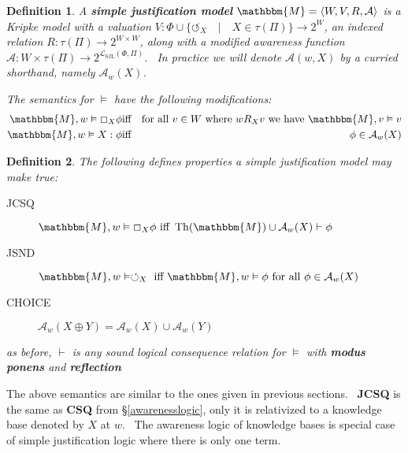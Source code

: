 \documentclass{acmconf}
\newcommand{\tmop}[1]{\ensuremath{\operatorname{#1}}}
\newcommand{\tmstrong}[1]{\textbf{#1}}
\newcommand{\tmtextbf}[1]{{\bfseries{#1}}}
\newenvironment{descriptiondash}{\begin{description} }{\end{description}}
\newtheorem{definition}{Definition}
\begin{document}
\begin{definition}
  \label{justmodels}A {\tmstrong{simple justification model}} $\mathbbm{M}=
  \langle W, V, R, \mathcal{A} \rangle$ is a Kripke model with a valuation $V
  : \Phi \cup \{\circlearrowleft_X \hspace{1em} | \hspace{1em} X \in \tau
  (\Pi)\} \rightarrow 2^W$, an indexed relation $R : \tau (\Pi) \rightarrow
  2^{W \times W}$, along with a modified awareness function $\mathcal{A} : W
  \times \tau (\Pi) \rightarrow 2^{\mathcal{L}_{\tmop{SJL}} (\Phi, \Pi)}$. \
  In practice we will denote $\mathcal{A} (w, X)$ by a curried shorthand,
  namely $\mathcal{A}_w (X)$.
  
  
  
  The semantics for $\vDash$ have the following modifications:
  \begin{eqnarray*}
    \mathbbm{M}, w \vDash \Box_X \phi & \text{iff} & \text{for all $v \in W$
    where $w R_X v$ we have $\mathbbm{M}, v \vDash v$}\\
    \mathbbm{M}, w \vDash X : \phi & \text{iff} & \phi \in \mathcal{A}_w (X)
  \end{eqnarray*}
\end{definition}

\begin{definition}
  The following defines properties a simple justification model may make true:
  
  \begin{descriptiondash}
    \item[JCSQ] $\mathbbm{M}, w \vDash \Box_X \phi \text{ iff } \tmop{Th}
    (\mathbbm{M}) \cup \mathcal{A}_w (X) \vdash \phi$
    
    \item[JSND] $\mathbbm{M}, w \vDash \circlearrowleft_X \text{ iff
    $\mathbbm{M}, w \vDash \phi$ for all $\phi \in \mathcal{A}_w (X)$}$
    
    \item[CHOICE] $\mathcal{A}_w (X \oplus Y) = \mathcal{A}_w (X) \cup
    \mathcal{A}_w (Y)$
  \end{descriptiondash}
  
  as before, $\vdash$ is any sound logical consequence relation for $\vDash$
  with \tmtextbf{modus ponens} and \tmtextbf{reflection}
\end{definition}

The above semantics are similar to the ones given in previous sections. \
\tmtextbf{JCSQ} is the same as \tmtextbf{CSQ} from {\S}\ref{awarenesslogic},
only it is relativized to a knowledge base denoted by $X$ at $w$. \ The
awareness logic of knowledge bases is special case of simple justification
logic where there is only one term.
\end{document}
